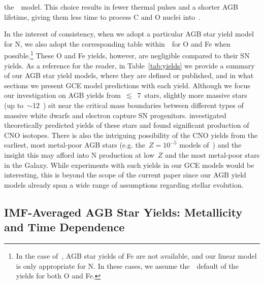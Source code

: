 \documentclass[ms.tex]{subfiles}
\begin{document}
the~\karakas~model.
This choice results in fewer thermal pulses and a shorter AGB lifetime, giving
them less time to process C and O nuclei into~\Nfourteen.
\par
In the interest of consistency, when we adopt a particular AGB star yield model
for N, we also adopt the corresponding table within~\vice~for O and Fe when
possible.\footnote{
	In the case of~\citet{Ventura2013, Ventura2014, Ventura2018, Ventura2020},
	AGB star yields of Fe are not available, and our linear model is only
	appropriate for N.
	In these cases, we assume the~\vice~default of the~\citet{Cristallo2011,
	Cristallo2015} yields for both O and Fe.
}
These O and Fe yields, however, are negligible compared to their SN yields.
As a reference for the reader, in Table~\ref{tab:yields} we provide a summary
of our AGB star yield models, where they are defined or published, and in what
sections we present GCE model predictions with each yield.
Although we focus our investigation on AGB yields from~$\lesssim$~7~\msun stars,
slightly more massive stars (up to~$\sim$12~\msun) sit near the critical mass
boundaries between different types of massive white dwarfs and electron capture
SN progenitors.
\citet{Doherty2017} investigated theoretically predicted yields of these stars
and found significant production of CNO isotopes.
There is also the intriguing possibility of the CNO yields from the earliest,
most metal-poor AGB stars (e.g. the~$Z = 10^{-5}$ models
of~\citealp{Gil-Pons2013, Gil-Pons2021}) and the insight this may afford into
N production at low~$Z$ and the most metal-poor stars in the Galaxy.
While experiments with such yields in our GCE models would be interesting, this
is beyond the scope of the current paper since our AGB yield models already
span a wide range of assumptions regarding stellar evolution.



\subsection{IMF-Averaged AGB Star Yields: Metallicity and Time Dependence}
\label{sec:yields:imf_agb}
\end{document}
